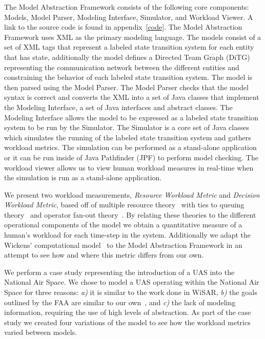 The Model Abstraction Framework consists of the following core components:  Models, Model Parser, Modeling Interface, Simulator, and Workload Viewer.  A link to the source code is found in appendix~\ref{code}.  The Model Abstraction Framework uses XML as the primary modeling language.  The models consist of a set of XML tags that represent a labeled state transition system for each entity that has state, additionally the model defines a Directed Team Graph (DiTG) representing the communication network between the different entities and constraining the behavior of each labeled state transition system.  The model is then parsed using the Model Parser.  The Model Parser checks that the model syntax is correct and converts the XML into a set of Java classes that implement the Modeling Interface, a set of Java interfaces and abstract classes.  The Modeling Interface allows the model to be expressed as a labeled state transition system to be run by the Simulator.  The Simulator is a core set of Java classes which simulates the running of the labeled state transition system and gathers workload metrics.  The simulation can be performed as a stand-alone application or it can be run inside of Java Pathfinder (JPF) to perform model checking.  The workload viewer allows us to view human workload measures in real-time when the simulation is run as a stand-alone application.

We present two workload measurements, {\em Resource Workload Metric} and {\em Decision Workload Metric}, based off of multiple resource theory~\cite{wickens2002multiple} with ties to queuing theory~\cite{newell1994unified} and operator fan-out theory~\cite{goodrich2010fanout}.  By relating these theories to the different operational components of the model we obtain a quantitative measure of a human's workload for each time-step in the system.  Additionally we adapt the Wickens' computational model~\cite{wickens2002multiple} to the Model Abstraction Framework in an attempt to see how and where this metric differs from our own.

We perform a case study representing the introduction of a UAS into the National Air Space.  We chose to model a UAS operating within the National Air Space for three reasons: {\em a)} it is similar to the work done in WiSAR, {\em b)} the goals outlined by the FAA are similar to our own~\cite{nasroadmap}, and {\em c)} the lack of modeling information, requiring the use of high levels of abstraction.  As part of the case study we created four variations of the model to see how the workload metrics varied between models.


